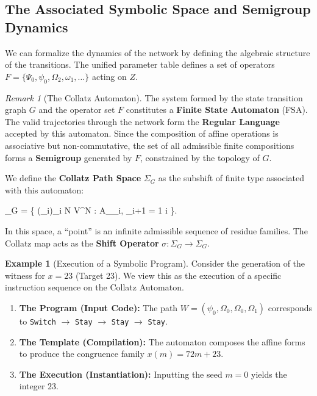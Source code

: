 \documentclass[11pt,letterpaper]{amsart}
\def\mathcal#1{#1}%
\def\mathbb#1{#1}%
\def\[{ }%
\def\]{ }%
\theoremstyle{definition}
\newtheorem{example}{Example}
\theoremstyle{plain}
\theoremstyle{plain}
\theoremstyle{remark}
\newtheorem*{remark}{Remark}
\begin{document}
\subsection{The Associated Symbolic Space and Semigroup Dynamics}

We can formalize the dynamics of the network by defining the algebraic structure of the transitions. The unified parameter table defines a set of operators $\mathcal{F} = \{ \Psi_0, \psi_0, \Omega_2, \omega_1, \dots \}$ acting on $\mathbb{Z}$.

\begin{remark}[The Collatz Automaton]
The system formed by the state transition graph $G$ and the operator set $\mathcal{F}$ constitutes a \textbf{Finite State Automaton} (FSA). The valid trajectories through the network form the \textbf{Regular Language} accepted by this automaton. Since the composition of affine operations is associative but non-commutative, the set of all admissible finite compositions forms a \textbf{Semigroup} generated by $\mathcal{F}$, constrained by the topology of $G$.
\end{remark}

We define the \textbf{Collatz Path Space} $\Sigma_G$ as the subshift of finite type associated with this automaton:
\[
\Sigma_G = \{ (\rho_i)_{i \in \mathbb{N}} \in V^{\mathbb{N}} : A_{\rho_i, \rho_{i+1}} = 1  i \}.
\]
In this space, a ``point'' is an infinite admissible sequence of residue families. The Collatz map acts as the \textbf{Shift Operator} $\sigma: \Sigma_G \to \Sigma_G$.

\begin{example}[Execution of a Symbolic Program]
Consider the generation of the witness for $x=23$ (Target 23). We view this as the execution of a specific instruction sequence on the Collatz Automaton.
\begin{enumerate}
    \item \textbf{The Program (Input Code):} The path $W = (\psi_0, \Omega_0, \Omega_0, \Omega_1)$ corresponds to \texttt{Switch} $\to$ \texttt{Stay} $\to$ \texttt{Stay} $\to$ \texttt{Stay}.
    \item \textbf{The Template (Compilation):} The automaton composes the affine forms to produce the congruence family $x(m) = 72m + 23$.
    \item \textbf{The Execution (Instantiation):} Inputting the seed $m=0$ yields the integer $23$.
\end{enumerate}
\end{example}
\end{document}
